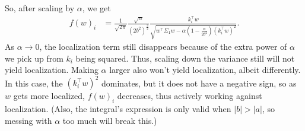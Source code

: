 \documentclass{article}
\begin{document}
So, after scaling by $\alpha$, we get 
\begin{align*}
  f(w)_i 
  &= \frac{1}{\sqrt{2\pi}} \frac{\sqrt{\alpha}}{(2b^2)^{\frac{3}{2}}} \frac{ k_i^\top w }{ \sqrt{ w^\top \Sigma_1 w - \alpha ( 1 - \frac{\alpha}{2b^2} ) (k_i^\top w)^2 } }.
\end{align*}
As $\alpha \to 0$, the localization term still disappears because of the extra power of $\alpha$ we pick up from $k_i$ being squared. 
Thus, scaling down the variance still will not yield localization.
Making $\alpha$ larger also won't yield localization, albeit differently.
In this case, the $(k_i^\top w)^2$ dominates, but it does not have a negative sign, so as $w$ gets more localized, $f(w)_i$ decreases, thus actively working against localization.
(Also, the integral's expression is only valid when $|b| > |a|$, so messing with $\alpha$ too much will break this.)
\end{document}
